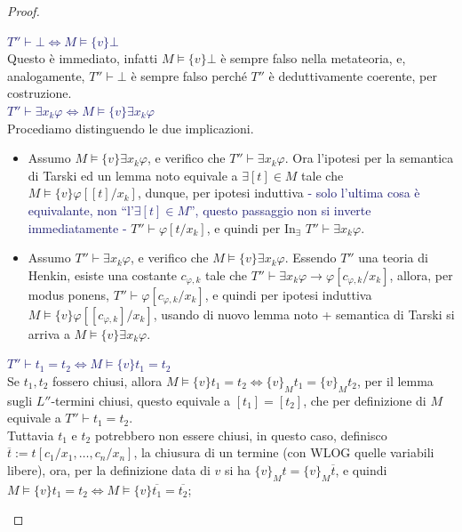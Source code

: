 \begin{proof}
\begin{enumerate}
        \textcolor{MidnightBlue}{$T'' \vdash \bot \iff M \models \{v\}\bot$}\\
        Questo è immediato, infatti $M \models \{v\}\bot$ è sempre falso nella metateoria, e, analogamente, $T'' \vdash \bot$ è sempre falso perché $T''$ è deduttivamente coerente, per costruzione.\\
        \textcolor{MidnightBlue}{$T'' \vdash \exists x_k \varphi \iff M \models \{v\}\exists x_k \varphi$}\\
        Procediamo distinguendo le due implicazioni.
        \begin{itemize}
            \item[$\boxed{\impliedby}$] Assumo $M \models \{v\}\exists x_k \varphi$, e verifico che $T'' \vdash \exists x_k \varphi$. Ora l'ipotesi per la semantica di Tarski ed un lemma noto equivale a $\exists [t] \in M$ tale che $M \models \{v\}\varphi[[t]/x_k]$,
            dunque, per ipotesi induttiva \textcolor{MidnightBlue}{- solo l'ultima cosa è equivalante, non ``l'$\exists [t] \in M$'', questo passaggio non si inverte immediatamente -} $T'' \vdash \varphi[t/x_k]$, e quindi per In$_\exists$ $T'' \vdash \exists x_k \varphi$.
            \item[$\boxed{\implies}$] Assumo $T'' \vdash \exists x_k \varphi$, e verifico che $M \models \{v\}\exists x_k \varphi$. Essendo $T''$ una teoria di Henkin, esiste una costante $c_{\varphi,k}$ tale che $T'' \vdash \exists x_k \varphi \to \varphi[c_{\varphi,k}/x_k]$,
            allora, per modus ponens, $T'' \vdash \varphi[c_{\varphi,k}/x_k]$, e quindi per ipotesi induttiva $M \models \{v\}\varphi[[c_{\varphi,k}]/x_k]$, usando di nuovo lemma noto + semantica di Tarski si arriva a $M \models \{v\}\exists x_k \varphi$.
        \end{itemize}
        \textcolor{MidnightBlue}{$T'' \vdash t_1 = t_2 \iff M \models \{v\}t_1 = t_2$}\\
        Se $t_1,t_2$ fossero chiusi, allora $M \models \{v\}t_1 = t_2 \iff \{v\}_M t_1 = \{v\}_M t_2$, per il lemma sugli $L''$-termini chiusi, questo equivale a $[t_1] = [t_2]$, che per definizione di $M$ equivale a $T'' \vdash t_1 = t_2$.\\
        Tuttavia $t_1$ e $t_2$ potrebbero non essere chiusi, in questo caso, definisco $\overline t := t[c_1/x_1,\ldots,c_n/x_n]$, la chiusura di un termine (con WLOG quelle variabili libere), ora, per la definizione data di $v$ si ha $\{v\}_M t = \{v\}_M \overline t$, e quindi $M \models \{v\}t_1 = t_2 \iff M \models \{v\}\overline{t_1} = \overline{t_2}$;

\end{enumerate}
\end{proof}
